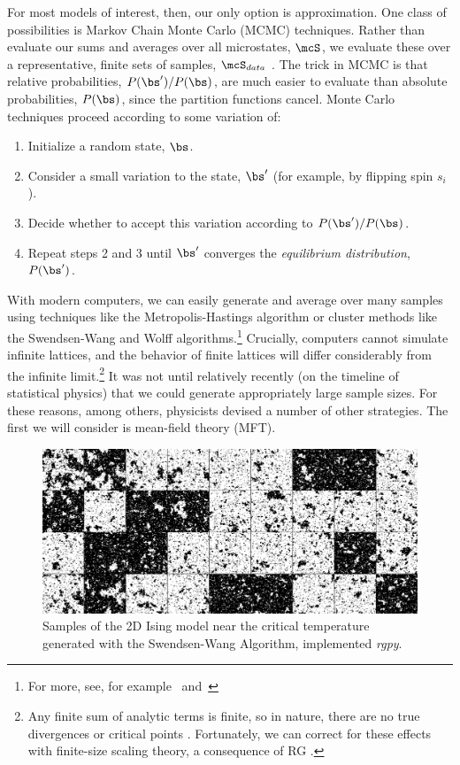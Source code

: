 For most models of interest, then, our only option is approximation.
One class of possibilities is Markov Chain Monte Carlo (MCMC)
techniques. Rather than evaluate our sums and averages over all
microstates, $\mcS$, we evaluate these over a representative, finite
sets of samples, $\mcS_{data}$ . The trick in MCMC is
that relative probabilities, $P(\bs')/P(\bs)$, are much easier to
evaluate than absolute probabilities, $P(\bs)$, since the partition
functions cancel. Monte Carlo techniques proceed according to some
variation of:
\begin{enumerate}
\item Initialize a random state, $\bs$.
\item Consider a small variation to the state, $\bs'$ (for example, by
  flipping spin $s_i$).
\item Decide whether to accept this variation according to
  $P(\bs')/P(\bs)$.
\item Repeat steps 2 and 3 until $\bs'$ converges the
  \textit{equilibrium distribution}, $P(\bs')$.
\end{enumerate}
With modern computers, we can easily generate and average over many
samples using techniques like the Metropolis-Hastings algorithm or
cluster methods like the Swendsen-Wang and Wolff
algorithms.\footnote{For more, see, for example~\cite{mcmc}
  and~\cite{cluster-mcmc}} Crucially, computers cannot simulate
infinite lattices, and the behavior of finite lattices will differ
considerably from the infinite limit.\footnote{Any finite sum of
  analytic terms is finite, so in nature, there are no true
  divergences or critical points
  . Fortunately, we can correct for these
  effects with finite-size scaling theory, a consequence of RG
  .} It was not until relatively
recently (on the timeline of statistical physics) that we could
generate appropriately large sample sizes. For these reasons, among
others, physicists devised a number of other strategies. The first we
will consider is mean-field theory (MFT).
\begin{figure}[ht]
  \centering \includegraphics[width=\textwidth]{figures/samples.png}
  \caption{Samples of the 2D Ising model near the critical temperature
    generated with the Swendsen-Wang Algorithm, implemented
    \textit{rgpy}.\label{fig:mcmc} }
\end{figure}

